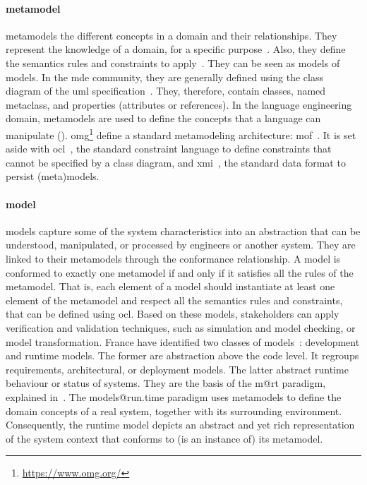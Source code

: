 \paragraph{\Gls{metamodel}}
\Glspl{metamodel} the different concepts in a domain and their relationships.
They represent the knowledge of a domain, for a specific purpose~\cite{DBLP:conf/iceccs/BezivinJT05}.
Also, they define the semantics rules and constraints to apply~\cite{DBLP:journals/computer/Schmidt06}.
They can be seen as \glspl{model} of \glspl{model}.
In the \gls{mde} community, they are generally defined using the class diagram of the \gls{uml} specification~\cite{omg2017umlspec}.
They, therefore, contain classes, named metaclass, and properties (attributes or references).
In the language engineering domain, \glspl{metamodel} are used to define the concepts that a language can manipulate (\cf {}).
\gls{omg}\footnote{\url{https://www.omg.org/}} define a standard metamodeling architecture: \gls{mof}~\cite{MOF:Spec}.
It is set aside with \gls{ocl}~\cite{OCL:Spec}, the standard constraint language to define constraints that cannot be specified by a class diagram, and \gls{xmi}~\cite{XMI:Spec}, the standard data format to persist (meta)\glspl{model}. 

\paragraph{\Gls{model}}
\Glspl{model} capture some of the system characteristics into an abstraction that can be understood, manipulated, or processed by engineers or another system.
They are linked to their \glspl{metamodel} through the conformance relationship.
A \gls{model} is conformed to exactly one \gls{metamodel} if and only if it satisfies all the rules of the \gls{metamodel}.
That is, each element of a \gls{model} should instantiate at least one element of the \gls{metamodel} and respect all the semantics rules and constraints, that can be defined using \gls{ocl}.
Based on these models, stakeholders can apply verification and validation techniques, such as simulation and model checking, or model transformation.
France \etal have identified two classes of models~\cite{DBLP:conf/icse/FranceR07}: development and runtime models.
The former are abstraction above the code level.
It regroups requirements, architectural, or deployment models.
The latter abstract runtime behaviour or status of systems. 
They are the basis of the \gls{m@rt} paradigm, explained in~.
The models@run.time paradigm uses \glspl{metamodel} to define the domain concepts of a real system, together with its surrounding environment. 
Consequently, the runtime model depicts an abstract and yet rich representation of the system context that conforms to (is an instance of) its \gls{metamodel}.


